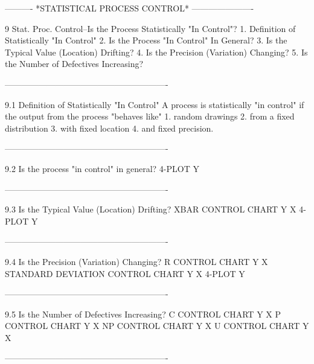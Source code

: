  
 
 
 
 
 
 
 
 
 
 
 
 
 
 
 
 
 
 
 
 
----------  *STATISTICAL PROCESS CONTROL*  ----------------------
 
9
Stat. Proc. Control--Is the Process Statistically "In Control"?
   1. Definition of Statistically "In Control"
   2. Is the Process "In Control" In General?
   3. Is the Typical Value (Location) Drifting?
   4. Is the Precision (Variation) Changing?
   5. Is the Number of Defectives Increasing?
 
----------------------------------------------------------
 
9.1
Definition of Statistically "In Control"
   A process is statistically "in control" if
   the output from the process "behaves like"
      1. random drawings
      2. from a fixed distribution
      3. with fixed location
      4. and fixed precision.
 
----------------------------------------------------------
 
9.2
Is the process "in control" in general?
      4-PLOT Y
 
----------------------------------------------------------
 
9.3
Is the Typical Value (Location) Drifting?
      XBAR CONTROL CHART Y X
      4-PLOT Y
 
----------------------------------------------------------
 
9.4
Is the Precision (Variation) Changing?
      R CONTROL CHART Y X
      STANDARD DEVIATION CONTROL CHART Y X
      4-PLOT Y
 
----------------------------------------------------------
 
9.5
Is the Number of Defectives Increasing?
      C CONTROL CHART Y X
      P CONTROL CHART Y X
      NP CONTROL CHART Y X
      U CONTROL CHART Y X
 
----------------------------------------------------------
 
 
 
 
 
 
 
 
 
 
 
